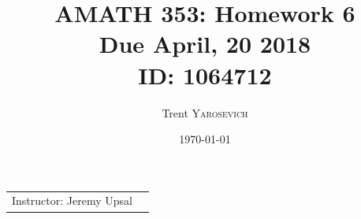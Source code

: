 \documentclass{article}
\title{AMATH 353: Homework 6 \\Due April, 20 2018 \\ ID: 1064712} %
\author{Trent \textsc{Yarosevich}} %
\date{\today} %
\begin{document}
\maketitle %
\setlength\parindent{1cm}

\begin{center}
\begin{tabular}{l r}
Instructor: Jeremy Upsal %
\end{tabular}
\end{center}


\end{document}
